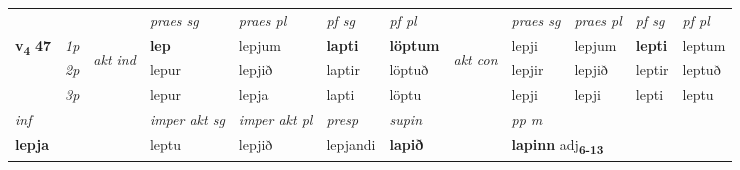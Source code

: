 \begin{longtable}[l]{X>{\footnotesize\itshape}llXXXXlXXXX}
 & &   & \textit{praes sg}  & \textit{praes pl}    & \textit{ pf sg} & \textit{pf pl} & & \textit{praes sg}  & \textit{praes pl}    & \textit{pf sg} & \textit{pf pl }  \\ \cmidrule{4-7} \cmidrule{9-12}
 \multirow{2}{*}{{{\textbf{v{\textsubscript{4}}} \Large{\textbf{47}}}}}  & 1p & \multirow{3}{*}{\begin{turn}{90}\textit{akt ind}\end{turn}} & \textbf{lep} & lepjum & \textbf{lapti} & \textbf{löptum} & \multirow{3}{*}{\begin{turn}{90}\textit{akt con}\end{turn}} &lepji & lepjum & \textbf{lepti} & leptum\\*
 & 2p &  &  lepur  & lepjið & laptir & löptuð & & lepjir & lepjið & leptir & leptuð \\*
 & 3p &  & lepur & lepja & lapti & löptu & & lepji & lepji& lepti & leptu \\*
\cmidrule{4-7} \cmidrule{9-12}

   {\textit{inf}} & &  & \textit{imper akt sg} & \textit{imper akt pl}   & \textit{presp} & \textit{supin}  && \textit{pp m} \\*
  {\textbf{lepja}} & && leptu  & lepjið   & lepjandi &  \textbf{lapið}  && \multicolumn{2}{l}{\textbf{lapinn} adj\textbf{\textsubscript{6-13}}} \\*

\midrule


\end{longtable}

